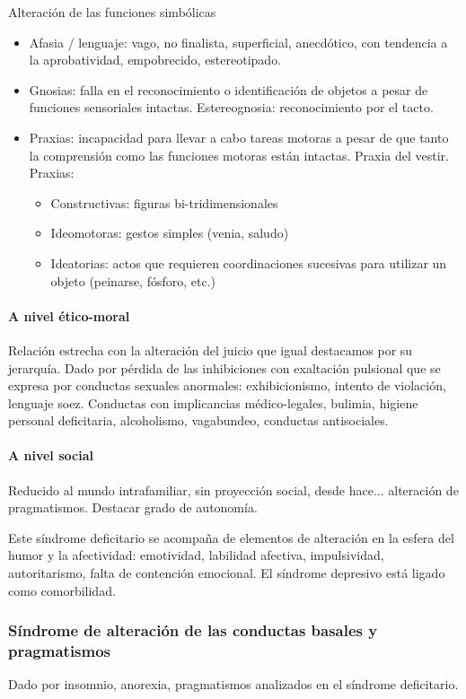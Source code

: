 \documentclass{scrbook}
\begin{document}
Alteración de las funciones simbólicas
\begin{itemize}
	\item Afasia / lenguaje: vago, no finalista, superficial, anecdótico, con tendencia a la aprobatividad, empobrecido, estereotipado.
	\item Gnosias: falla en el reconocimiento o identificación de objetos a pesar de funciones sensoriales intactas. Estereognosia: reconocimiento por el tacto.
	\item Praxias: incapacidad para llevar a cabo tareas motoras a pesar de que tanto la comprensión como las funciones motoras están intactas. Praxia del vestir. Praxias:
	\begin{itemize}
		\item Constructivas: figuras bi-tridimensionales
		\item Ideomotoras: gestos simples (venia, saludo)
		\item Ideatorias: actos que requieren coordinaciones sucesivas para utilizar un objeto (peinarse, fósforo, etc.)
	\end{itemize}
\end{itemize}
\paragraph{A nivel ético-moral}
Relación estrecha con la alteración del juicio que igual destacamos por su jerarquía. Dado por pérdida de las inhibiciones con exaltación pulsional que se expresa por conductas sexuales anormales: exhibicionismo, intento de violación, lenguaje soez. Conductas con implicancias médico-legales, bulimia, higiene personal deficitaria, alcoholismo, vagabundeo, conductas antisociales.
\paragraph{A nivel social}
Reducido al mundo intrafamiliar, sin proyección social, desde hace... alteración de pragmatismos. Destacar grado de autonomía. 

Este síndrome deficitario se acompaña de elementos de alteración en la esfera del humor y la afectividad: emotividad, labilidad afectiva, impulsividad, autoritarismo, falta de contención emocional. El síndrome depresivo está ligado como comorbilidad.
\subsubsection*{Síndrome de alteración de las conductas basales y pragmatismos}
Dado por insomnio, anorexia, pragmatismos analizados en el síndrome deficitario.
\end{document}
